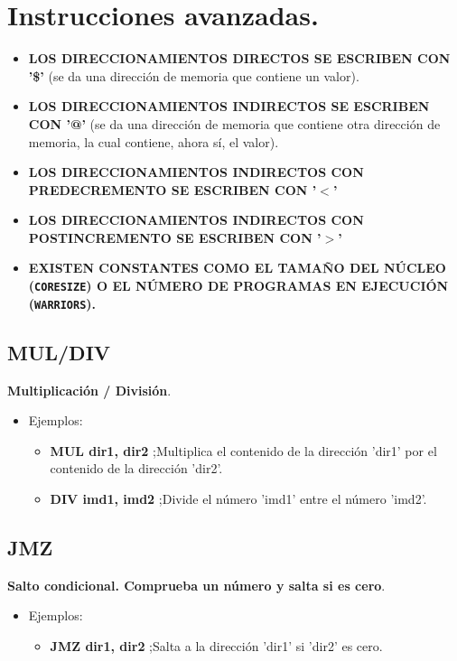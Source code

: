 \newpage
\section{Instrucciones avanzadas.}

\begin{tcolorbox}
    \begin{itemize}
        \item \textbf{LOS DIRECCIONAMIENTOS DIRECTOS SE ESCRIBEN CON '\$' } \newline (se da una dirección de memoria que contiene un valor).
        \item \textbf{LOS DIRECCIONAMIENTOS INDIRECTOS SE ESCRIBEN CON '@'} \newline (se da una dirección de memoria que contiene otra dirección de memoria, la cual contiene, ahora sí, el valor).
        \item \textbf{LOS DIRECCIONAMIENTOS INDIRECTOS CON \newline PREDECREMENTO SE ESCRIBEN CON '$<$'}
        \item \textbf{LOS DIRECCIONAMIENTOS INDIRECTOS CON \newline POSTINCREMENTO SE ESCRIBEN CON '$>$'}
        \item \textbf{EXISTEN CONSTANTES COMO EL TAMAÑO DEL NÚCLEO (\texttt{CORESIZE}) O EL NÚMERO DE PROGRAMAS EN EJECUCIÓN (\texttt{WARRIORS}).}
    \end{itemize}
\end{tcolorbox}

\subsection{MUL/DIV}
\textbf{Multiplicación / División}.
\begin{itemize}
    \item Ejemplos:
    \begin{itemize}
        \item \textbf{MUL dir1, dir2} ;Multiplica el contenido de la dirección 'dir1' por el contenido de la dirección 'dir2'.
        \item \textbf{DIV imd1, imd2} ;Divide el número 'imd1' entre el número 'imd2'.
    \end{itemize}
\end{itemize}

\subsection{JMZ}
\textbf{Salto condicional. Comprueba un número y salta si es cero}.
\begin{itemize}
    \item Ejemplos:
    \begin{itemize}
        \item \textbf{JMZ dir1, dir2} ;Salta a la dirección 'dir1' si 'dir2' es cero.
    \end{itemize}
\end{itemize}

